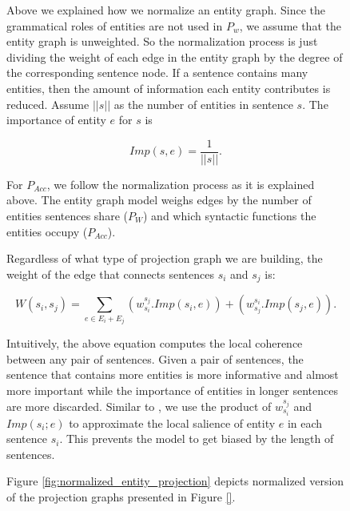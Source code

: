 \begin{figure}[!t]
Above we explained how we normalize an entity graph. 
Since the grammatical roles of entities are not used in $P_w$,  we assume that the entity graph is unweighted. 
So the normalization process is just dividing the weight of each edge in the entity graph by the degree of the corresponding sentence node. 
If a sentence contains many entities, then the amount of information each entity contributes is reduced.
Assume $||s||$ as the number of entities in sentence $s$.  
The importance of entity $e$ for $s$ is 

\begin{equation}
Imp(s,e) = \frac{1}{||s||}.
\end{equation}

For $P_{Acc}$, we follow the normalization process as it is explained above. 
The entity graph model weighs edges by the number of entities sentences share ($P_W$) and which syntactic functions the entities occupy ($P_{Acc}$). 


Regardless of what type of projection graph we are building, the weight of the edge that connects sentences $s_i$ and $s_j$ is:

\begin{equation}
W(s_i,s_j) = \sum_{e \in E_i+E_j}{(w_{s_i}^{s_j}.Imp(s_i,e))+(w_{s_j}^{s_i}.Imp(s_j,e))}.
\end{equation}

Intuitively, the above equation computes the local coherence between any pair of sentences. 
Given a pair of sentences, the sentence that contains more entities is more informative and almost more important while the importance of entities in longer sentences are more discarded. 
Similar to \cite{rode08}, we use the product of $w_{s_i}^{s_j}$ and $Imp(s_i; e)$ to approximate the local salience of entity $e$ in each sentence $s_i$. 
This prevents the model to get biased by the length of sentences. 

Figure \ref{fig:normalized_entity_projection} depicts normalized version of the projection graphs presented in Figure \ref{}. 




\end{figure}
